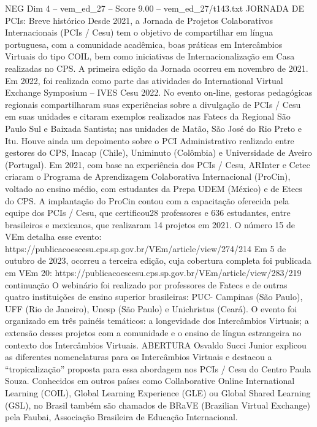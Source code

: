 \begin{textsample}{NEG Dim 4 – vem\_ed\_27 – Score 9.00 – vem\_ed\_27/t143.txt}  \label{ex:f4_neg_151}
JORNADA DE PCIs: Breve histórico Desde 2021, a Jornada de Projetos Colaborativos Internacionais (PCIs / Cesu) tem o objetivo de compartilhar em língua portuguesa, com a comunidade acadêmica, boas práticas em Intercâmbios Virtuais do tipo COIL, bem como iniciativas de Internacionalização em Casa realizadas no CPS.
A primeira edição da Jornada ocorreu em novembro de 2021.
Em 2022, foi realizada como parte das atividades do International Virtual Exchange Symposium – IVES Cesu 2022.
No evento on-line, gestoras pedagógicas regionais compartilharam suas experiências sobre a divulgação de PCIs / Cesu em suas unidades e citaram exemplos realizados nas Fatecs da Regional São Paulo Sul e Baixada Santista; nas unidades de Matão, São José do Rio Preto e Itu.
Houve ainda um depoimento sobre o PCI Administrativo realizado entre gestores do CPS, Inacap (Chile), Uniminuto (Colômbia) e Universidade de Aveiro (Portugal).
Em 2021, com base na experiência dos PCIs / Cesu, ARInter e Cetec criaram o Programa de Aprendizagem Colaborativa Internacional (ProCin), voltado ao ensino médio, com estudantes da Prepa UDEM (México) e de Etecs do CPS.
A implantação do ProCin contou com a capacitação oferecida pela equipe dos PCIs / Cesu, que certificou28 professores e 636 estudantes, entre brasileiros e mexicanos, que realizaram 14 projetos em 2021.
O número 15 de VEm detalha esse evento: https://publicacoescesu.cps.sp.gov.br/VEm/article/view/274/214 Em 5 de outubro de 2023, ocorreu a terceira edição, cuja cobertura completa foi publicada em VEm 20: https://publicacoescesu.cps.sp.gov.br/VEm/article/view/283/219 continuação O webinário foi realizado por professores de Fatecs e de outras quatro instituições de ensino superior brasileiras: PUC- Campinas (São Paulo), UFF (Rio de Janeiro), Unesp (São Paulo) e Unichristus (Ceará).
O evento foi organizado em três painéis temáticos: a longevidade dos Intercâmbios Virtuais; a extensão desses projetos com a comunidade e o ensino de língua estrangeira no contexto dos Intercâmbios Virtuais.
ABERTURA Osvaldo Succi Junior explicou as diferentes nomenclaturas para os Intercâmbios Virtuais e destacou a “tropicalização” proposta para essa abordagem nos PCIs / Cesu do Centro Paula Souza.
Conhecidos em outros países como Collaborative Online International Learning (COIL), Global Learning Experience (GLE) ou Global Shared Learning (GSL), no Brasil também são chamados de BRaVE (Brazilian Virtual Exchange) pela Faubai, Associação Brasileira de Educação Internacional.

\end{textsample}
